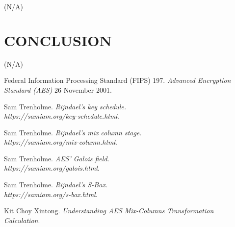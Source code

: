 \documentclass[a4paper, 10pt]{article}
\begin{document}
\begin{multicols}{2}
        (N/A)

        \section{CONCLUSION}

        (N/A)

        \begin{thebibliography}{3}
            Federal Information Processing Standard (FIPS) 197.
            \textit{Advanced Encryption Standard (AES)}
            26 November 2001.

            Sam Trenholme.
            \textit{Rijndael's key schedule.\\https://samiam.org/key-schedule.html}.

            Sam Trenholme.
            \textit{Rijndael's mix column stage.\\https://samiam.org/mix-column.html}.

            Sam Trenholme.
            \textit{AES' Galois field.\\https://samiam.org/galois.html}.

            Sam Trenholme.
            \textit{Rijndael's S-Box.\\https://samiam.org/s-box.html}.

            Kit Choy Xintong.
            \textit{Understanding AES Mix-Columns Transformation Calculation}.
        \end{thebibliography}

    \end{multicols}
\end{document}
